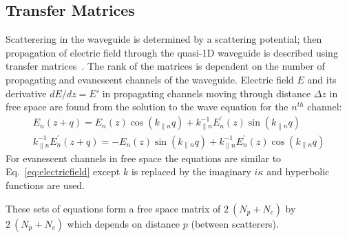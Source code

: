 \subsection{Transfer Matrices}
Scatterering in the waveguide is determined by a scattering potential; then propagation of electric field through the quasi-1D waveguide is described using transfer matrices~\cite{2004_Mello_Kumar_book}.
The rank of the matrices is dependent on the number of propagating and evanescent channels of the waveguide.  Electric field $E$ and its derivative $dE/dz=E'$ in propagating channels moving through distance $\Delta z$ in free space are found from the solution to the wave equation for the $n^{th}$ channel:
\begin{equation}
\begin{gathered}
E_n(z+q)=E_n(z)\cos(k_{\parallel n}q)+k_{\parallel n}^{-1}
E_n^{'}(z)\sin(k_{\parallel n}q) \\
k_{\parallel n}^{-1}E_n^{'}(z+q)=-E_n(z)\sin(k_{\parallel n} q)
+k_{\parallel n}^{-1}E_n^{'}(z)\cos(k_{\parallel n}q)
\end{gathered}
\label{eq:electricfield}
\end{equation}
For evanescent channels in free space the equations are similar to Eq.~\ref{eq:electricfield} except $k$ is replaced by the imaginary $i \kappa$ and hyperbolic functions are used. 

These sets of equations form a free space matrix of $2\ (N_p+N_c)$ by $2\ (N_p+N_c)$ which depends on distance $p$ (between scatterers). 


